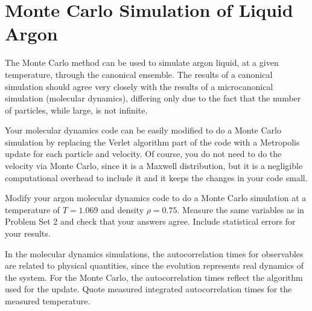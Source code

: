 \section{Monte Carlo Simulation of Liquid Argon}

The Monte Carlo method can be used to simulate argon liquid, at a given temperature, through
the canonical ensemble. The results of a canonical simulation should agree very closely with
the results of a microcanonical simulation (molecular dynamics), differing only due to the
fact that the number of particles, while large, is not infinite.

Your molecular dynamics code can be easily modified to do a Monte Carlo simulation by
replacing the Verlet algorithm part of the code with a Metropolis update for each particle
and velocity. Of course, you do not need to do the velocity via Monte Carlo, since it is a
Maxwell distribution, but it is a negligible computational overhead to include it and it
keeps the changes in your code small.

Modify your argon molecular dynamics code to do a Monte Carlo simulation at a temperature of
\(T = 1.069\) and density \(\rho = 0.75\). Measure the same variables as in Problem Set 2
and check that your answers agree. Include statistical errors for your results.

In the molecular dynamics simulations, the autocorrelation times for observables are related
to physical quantities, since the evolution represents real dynamics of the system. For the
Monte Carlo, the autocorrelation times reflect the algorithm used for the update. Quote
measured integrated autocorrelation times for the measured temperature.
